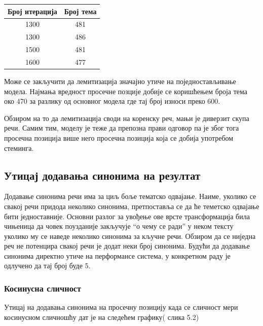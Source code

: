 \begin{center}
\begin{tabular}{|c|c|}
\hline
Број итерација & Број тема \\
\hline\hline
1300 & 481 \\
1300 & 486 \\
1500 & 481 \\
1600 & 477 \\
\hline
\end{tabular}
\end{center}

Може се закључити да лемитизација значајно утиче на поједностављивање модела. Најмања вредност просечне позције добије се коришћењем броја тема око  470 за разлику од основног модела где тај број износи преко 600.

Обзиром на то да лемитизација своди на коренску реч, мањи је диверзит скупа речи. Самим тим, моделу је теже да препозна прави одговор па је због тога просечна позиција више него просечна позиција која се добија употребом стеминга.

\subsection{Утицај додавања синонима на резултат}

Додавање синонима речи има за циљ боље тематско одвајање. Наиме, уколико се свакој речи придода неколико синонима, претпоставља се да ће теметско одвајање бити једноставније. Основни разлог за увођење ове врсте трансформација била чињеница да  човек поузданије закључује "`о чему се ради"' у неком тексту уколико му се наведе неколико синонима за кључне речи. Обзиром да се ниједна реч не потенцира свакој речи је додат неки број синонима. Будући да додавање синонима директно утиче на перформансе система, у конкретном раду је одлучено да тај број буде 5.

 


\subsubsection{Косинусна сличност}



Утицај  на додавања синонима на просечну позицију  када се сличност мери косинусном сличношћу дат је на следећем графику( слика 5.2)

